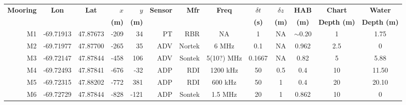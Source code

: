 \documentclass[letterpaper,10pt,landscape]{article}
\begin{document}
\thispagestyle{empty}



\begin{table}
  \centering
  \begin{tabular}{|r|c|c|r|r|r|r|c|c|c|c|c|c|} \hline
    {\bf Mooring}       & {\bf Lon}                  & {\bf Lat}                 & $x$                    & $y$                   & {\bf Sensor} &{\bf Mfr}   & {\bf Freq}&$\delta t$ &$\delta z$& {\bf HAB}  & {\bf Chart}        & {\bf Water}       \\
    ~                   &                            &                           & {\bf (m)}              & {\bf (m)}             &              &            &           & {\bf (s)} & {\bf (m)}& {\bf (m)}  & {\bf Depth (m)}    & {\bf Depth (m)}   \\\hline \hline
    M1                  & -69.71913                  & 47.87673                  & -209                   & 34                    & PT           & RBR        & NA        & 1         & NA       & $\sim0.20$ & 1                  &     1.75          \\\hline
    M2                  & -69.71977                  & 47.87700                  & -265                   & 35                    & ADV          & Nortek     & 6 MHz     & 0.1       & NA       & 0.962      & 2.5                &        0          \\\hline %
    M3                  & -69.72147                  & 47.87844                  & -458                   & 106                   & ADV          & Sontek     & 5(10?) MHz& 0.1667    & NA       & 0.82       & 5                  &     5.88          \\\hline
    M4                  & -69.72493                  & 47.87841                  & -676                   & -32                   & ADP          & RDI        & 1200 kHz  & 50        & 0.5      & 0.4        & 10                 &    11.50          \\\hline
    M5                  & -69.72315                  & 47.88202                  & -772                   & 381                   & ADP          & RDI        & 600 kHz   & 50        & 1        & 0.4        & 20                 &    20.10          \\\hline
    \multirow{4}{*}{M6} & \multirow{4}{*}{-69.72729} & \multirow{4}{*}{47.87844} & \multirow{4}{*}{-828}  & \multirow{4}{*}{-121} & ADP          & Sontek     & 1.5 MHz   & 20        & 1        & 0.862      & \multirow{4}{*}{10}&        0          \\ 

\end{tabular}
\end{table}
\end{document}
